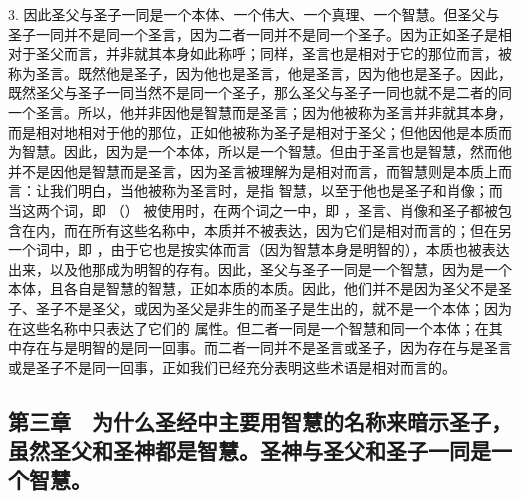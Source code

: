 3. 因此圣父与圣子一同是一个本体、一个伟大、一个真理、一个智慧。但圣父与圣子一同并不是同一个圣言，因为二者一同并不是同一个圣子。因为正如圣子是相对于圣父而言，并非就其本身如此称呼；同样，圣言也是相对于它的那位而言，被称为圣言。既然他是圣子，因为他也是圣言，他是圣言，因为他也是圣子。因此，既然圣父与圣子一同当然不是同一个圣子，那么圣父与圣子一同也就不是二者的同一个圣言。所以，他并非因他是智慧而是圣言；因为他被称为圣言并非就其本身，而是相对地相对于他的那位，正如他被称为圣子是相对于圣父；但他因他是本质而为智慧。因此，因为是一个本体，所以是一个智慧。但由于圣言也是智慧，然而他并不是因他是智慧而是圣言，因为圣言被理解为是相对而言，而智慧则是本质上而言：让我们明白，当他被称为圣言时，是指  智慧，以至于他也是圣子和肖像；而当这两个词，即 （） 被使用时，在两个词之一中，即 ，圣言、肖像和圣子都被包含在内，而在所有这些名称中，本质并不被表达，因为它们是相对而言的；但在另一个词中，即 ，由于它也是按实体而言（因为智慧本身是明智的），本质也被表达出来，以及他那成为明智的存有。因此，圣父与圣子一同是一个智慧，因为是一个本体，且各自是智慧的智慧，正如本质的本质。因此，他们并不是因为圣父不是圣子、圣子不是圣父，或因为圣父是非生的而圣子是生出的，就不是一个本体；因为在这些名称中只表达了它们的  属性。但二者一同是一个智慧和同一个本体；在其中存在与是明智的是同一回事。而二者一同并不是圣言或圣子，因为存在与是圣言或是圣子不是同一回事，正如我们已经充分表明这些术语是相对而言的。\par


\subsection{第三章　为什么圣经中主要用智慧的名称来暗示圣子，虽然圣父和圣神都是智慧。圣神与圣父和圣子一同是一个智慧。}

